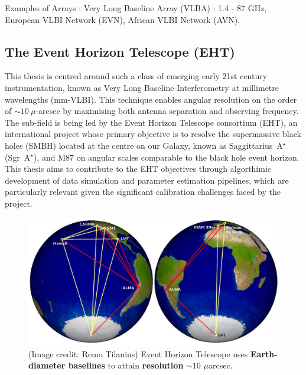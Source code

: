 
Examples of Arrays : Very Long Baseline Array (VLBA) : 1.4 - 87 GHz, European VLBI Network (EVN), African VLBI Network (AVN).  

\subsection{The Event Horizon Telescope (EHT)}
This thesis is centred around such a class of emerging early 21st century instrumentation, known as Very Long Baseline Interferometry at millimetre wavelengths (mm-VLBI). This technique enables angular resolution on the order of $\sim 10\ \mu$-arcsec by maximising both antenna separation and observing frequency. The sub-field is being led by the Event Horizon Telescope consortium (EHT), an international project whose primary objective is to resolve the supermassive black holes  (SMBH) located at the centre on our Galaxy, known as Saggittarius~A$^\star$ (Sgr~A$^\star$), and M87 on angular scales comparable to the black hole event horizon. This thesis aims to contribute to the EHT objectives through algorthimic development of data simulation and parameter estimation pipelines, which are particularly relevant given the significant calibration challenges faced by the project.

\begin{figure}
\begin{center}
\includegraphics[width=1.4\columnwidth]{Images/eht_globe}
\caption{(Image credit: Remo Tilanius) Event Horizon Telescope uses \textbf{Earth-diameter baselines} to attain \textbf{resolution} \boldmath$\sim 10$ $\mu$arcsec. \label{fig:eht_globe}%
}
\end{center}
\end{figure}

